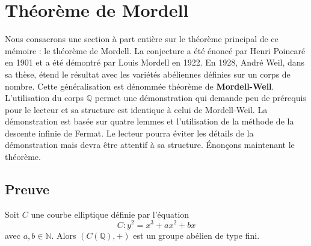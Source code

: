 \documentclass[a4paper]{article}
\begin{document}
\section{Théorème de Mordell}
\noindent Nous consacrons une section à part entière sur le théorème principal de ce mémoire : le théorème de Mordell. La conjecture a été énoncé par Henri Poincaré en 1901 et a été démontré par Louis Mordell en 1922. En 1928, André Weil, dans sa thèse, étend le résultat avec les variétés abéliennes définies sur un corps de nombre. Cette généralisation est dénommée théorème de \textbf{Mordell-Weil}. \\
L'utilisation du corps $\mathbb{Q}$ permet une démonstration qui demande peu de prérequis pour le lecteur et sa structure est identique à celui de Mordell-Weil. La démonstration est basée sur quatre lemmes et l'utilisation de la méthode de la descente infinie de Fermat. Le lecteur pourra éviter les détails de la démonstration mais devra être attentif à sa structure. Énonçons maintenant le théorème.
\subsection{Preuve}
\begin{theorem}
Soit $C$ une courbe elliptique définie par l'équation
\begin{equation}\label{mordell}
C : y^2=x^3+ax^2+bx
\end{equation}
avec $a,b \in \mathbb{N}$. Alors $(C(\mathbb{Q}),+)$ est un groupe abélien de type fini.
\end{theorem}
\end{document}
